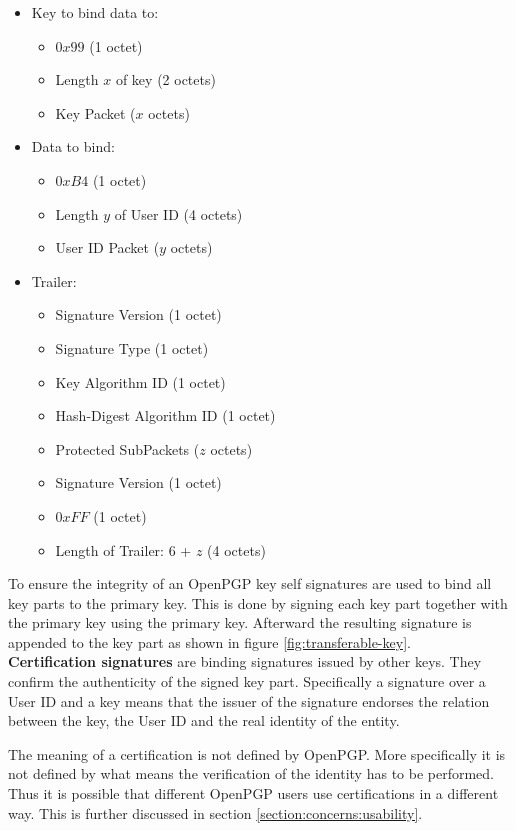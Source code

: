 \begin{itemize} \label{listing:signature}
	\item Key to bind data to:
	\begin{itemize}
		\item $0x99$ (1 octet)
		\item Length $x$ of key (2 octets)
		\item Key Packet ($x$ octets)
	\end{itemize}
	
	\item Data to bind:
	\begin{itemize}
		\item $0xB4$ (1 octet)
		\item Length $y$ of User ID (4 octets)
		\item User ID Packet ($y$ octets)
	\end{itemize}
	
	\item Trailer:
	\begin{itemize}
		\item Signature Version (1 octet)
		\item Signature Type (1 octet)
		\item Key Algorithm ID (1 octet)
		\item Hash-Digest Algorithm ID (1 octet)
		\item Protected SubPackets ($z$ octets)
		\item Signature Version (1 octet) 
		\item $0xFF$ (1 octet)
		\item Length of Trailer: 6 + $z$ (4 octets)
	\end{itemize}
\end{itemize}

To ensure the integrity of an OpenPGP key self signatures are used to bind all key parts to the primary key. This is done by signing each key part together with the primary key using the primary key. Afterward the resulting signature is appended to the key part as shown in figure \ref{fig:transferable-key}. \\

\textbf{Certification signatures} are binding signatures issued by other keys. They confirm the authenticity of the signed key part. Specifically a signature over a User ID and a key means that the issuer of the signature endorses the relation between the key, the User ID and the real identity of the entity.

The meaning of a certification is not defined by OpenPGP. More specifically it is not defined by what means the verification of the identity has to be performed. Thus it is possible that different OpenPGP users use certifications in a different way. This is further discussed in section \ref{section:concerns:usability}. \\

